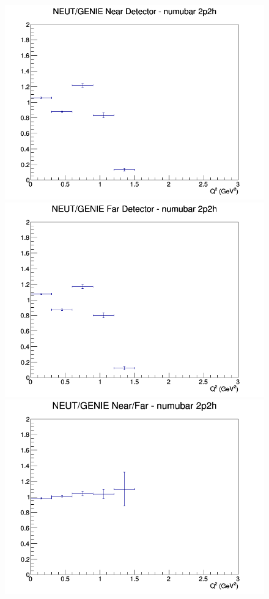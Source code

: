 \documentclass[12pt]{article}
\begin{document}
\begin{figure}[h]
\includegraphics[width=\linewidth]{Q2/nominal/ratios/2p2h_NEUT_GENIE_numubar_near_Q2.png}
\endminipage
{}
\includegraphics[width=\linewidth]{Q2/nominal/ratios/2p2h_NEUT_GENIE_numubar_far_Q2.png}
\endminipage
{}
\includegraphics[width=\linewidth]{Q2/nominal/ratios/2p2h_NEUT_GENIE_numubar_NF_Q2.png}

\end{figure}
\end{document}
